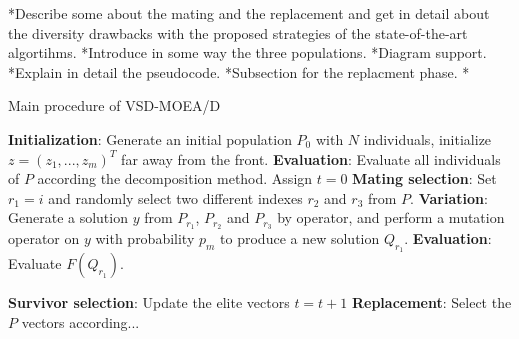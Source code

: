 *Describe some about the mating and the replacement and get in detail about the diversity drawbacks with the proposed strategies of the state-of-the-art algortihms.
*Introduce in some way the three populations.
*Diagram support.
*Explain in detail the pseudocode.
*Subsection for the replacment phase.
*

\begin{algorithm}[!t]
        \caption{Main procedure of VSD-MOEA/D} 
        \begin{small}
\begin{algorithmic}[1]
	\STATE \textbf{Initialization}: Generate an initial population $P_0$ with $N$ individuals, initialize $z = (z_1, ..., z_m)^T$ far away from the front.
	\STATE \textbf{Evaluation}: Evaluate all individuals of $P$ according the decomposition method.
        \STATE Assign $t=0$
               \STATE \textbf{Mating selection}: Set $r_1 = i$ and randomly select two different indexes $r_2$ and $r_3$ from $P$.	       
	       \STATE \textbf{Variation}: Generate a solution $y$ from $P_{r_1}$, $P_{r_2}$ and $P_{r_3}$ by \DE{} operator, and perform a mutation operator on $y$ with probability $p_m$ to produce a new solution $Q_{r_1}$.
	       \STATE \textbf{Evaluation}: Evaluate $F(Q_{r_1})$.

	       \STATE \textbf{Survivor selection}: Update the elite vectors
               \STATE $t=t+1$
	   \ENDFOR
	   \STATE \textbf{Replacement}: Select the $P$ vectors according...
        \ENDWHILE
        \end{algorithmic}
        \end{small}
\label{alg:vsd-moea}
\end{algorithm}




